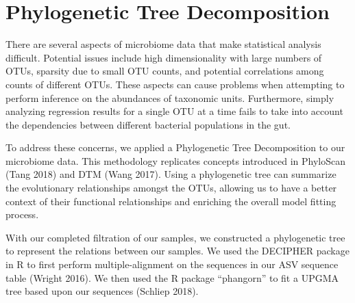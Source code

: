 \documentclass[12pt,twoside]{dukestatscithesis}
\begin{document}
\chapter{Phylogenetic Tree
Decomposition}\label{phylogenetic-tree-decomposition}

There are several aspects of microbiome data that make statistical
analysis difficult. Potential issues include high dimensionality with
large numbers of OTUs, sparsity due to small OTU counts, and potential
correlations among counts of different OTUs. These aspects can cause
problems when attempting to perform inference on the abundances of
taxonomic units. Furthermore, simply analyzing regression results for a
single OTU at a time fails to take into account the dependencies between
different bacterial populations in the gut.

To address these concerns, we applied a Phylogenetic Tree Decomposition
to our microbiome data. This methodology replicates concepts introduced
in PhyloScan (Tang 2018) and DTM (Wang 2017). Using a phylogenetic tree
can summarize the evolutionary relationships amongst the OTUs, allowing
us to have a better context of their functional relationships and
enriching the overall model fitting process.

With our completed filtration of our samples, we constructed a
phylogenetic tree to represent the relations between our samples. We
used the DECIPHER package in R to first perform multiple-alignment on
the sequences in our ASV sequence table (Wright 2016). We then used the
R package ``phangorn'' to fit a UPGMA tree based upon our sequences
(Schliep 2018).
\end{document}
